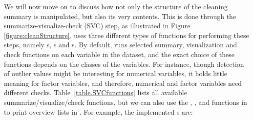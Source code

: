 \documentclass[article,shortnames]{jss}
\begin{document}
We will now move on to discuss how not only the structure of the
cleaning summary is manipulated, but also its very contents. This is
done through the summarize-visualize-check (SVC) step, as illustrated
in Figure \ref{figure:cleanStructure}.   uses three
different types of functions for performing these steps, namely
s, s and
s.  By default,  runs selected summary,
visualization and check functions on each variable in the dataset, and
the exact choice of these functions depends on the classes of the
variables. For instance, though detection of outlier values might be
interesting for numerical variables, it holds little meaning for
factor variables, and therefore, numerical and factor variables need
different checks. Table~\ref{table.SVCfunctions} lists all available
summarize/visualize/check functions, but we can also use the
, , and
 functions in  to print overview
lists in . For example, the implemented
s are:

\end{document}
